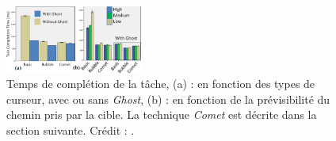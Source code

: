 	\begin{figure}
		\centering
		\includegraphics[width=0.4\textwidth]{figures/ch2/cometGhostPredictability}
		\caption[\emph{Comet/Ghost}, prévisibilité et résultats]{Temps de complétion de la tâche, (a) : en fonction des types de curseur, avec ou sans \emph{Ghost}, (b) : en fonction de la prévisibilité du chemin pris par la cible. La technique \emph{Comet} est décrite dans la section suivante. Crédit : \cite{hasan2011comet}.}
		\label{fig:cometGhostPredictability}
	\end{figure}
	
	
	
	

